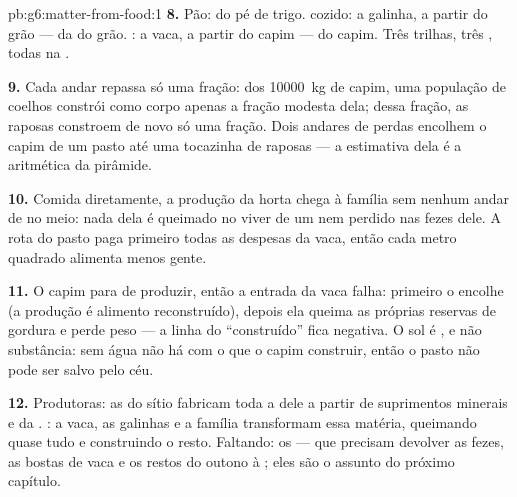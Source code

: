\begin{solution}{pb:g6:matter-from-food:1}
\textbf{8.} Pão:  do pé de trigo.  cozido: a galinha, a
partir do grão ---  da  do grão. : a vaca, a partir
do capim ---  do capim. Três trilhas, três , todas na .

\textbf{9.} Cada andar repassa só uma fração: dos \qty{10000}{kg} de
capim, uma população de coelhos constrói como corpo apenas a fração
modesta dela; dessa fração, as raposas constroem de novo só uma
fração. Dois andares de perdas encolhem o capim de um pasto até uma
tocazinha de raposas --- a estimativa dela é a aritmética da pirâmide.

\textbf{10.} Comida diretamente, a produção da horta chega à família
sem nenhum andar de  no meio: nada dela é queimado no viver
de um  nem perdido nas fezes dele. A rota do pasto paga
primeiro todas as despesas da vaca, então cada metro quadrado
alimenta menos gente.

\textbf{11.} O capim para de produzir, então a entrada da vaca falha:
primeiro o  encolhe (a produção é alimento reconstruído), depois
ela queima as próprias reservas de gordura e perde peso --- a linha do
``construído'' fica negativa. O sol é , e não substância: sem
água não há com o que o capim construir, então o pasto não pode ser
salvo pelo céu.

\textbf{12.} Produtoras: as  do sítio fabricam toda a  dele a partir de suprimentos minerais e da .
: a vaca, as galinhas e a família transformam essa
matéria, queimando quase tudo e construindo o resto. Faltando: os
 --- que precisam devolver as fezes, as bostas de vaca e
os restos do outono à ; eles são o assunto do próximo
capítulo.
\end{solution}
